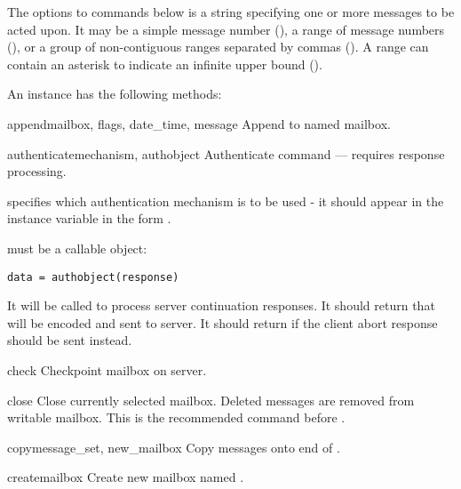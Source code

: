 The  options to commands below is a string specifying one
or more messages to be acted upon.  It may be a simple message number
(), a range of message numbers (), or a group of
non-contiguous ranges separated by commas ().  A range
can contain an asterisk to indicate an infinite upper bound
().

An  instance has the following methods:


\begin{methoddesc}{append}{mailbox, flags, date_time, message}
  Append  to named mailbox. 
\end{methoddesc}

\begin{methoddesc}{authenticate}{mechanism, authobject}
  Authenticate command --- requires response processing.

   specifies which authentication mechanism is to be
  used - it should appear in the instance variable 
  in the form .

   must be a callable object:

\begin{verbatim}
data = authobject(response)
\end{verbatim}

  It will be called to process server continuation responses.
  It should return  that will be encoded and sent to server.
  It should return  if the client abort response \samp{*} should
  be sent instead.
\end{methoddesc}

\begin{methoddesc}{check}{}
  Checkpoint mailbox on server. 
\end{methoddesc}

\begin{methoddesc}{close}{}
  Close currently selected mailbox. Deleted messages are removed from
  writable mailbox. This is the recommended command before
  .
\end{methoddesc}

\begin{methoddesc}{copy}{message_set, new_mailbox}
  Copy  messages onto end of . 
\end{methoddesc}

\begin{methoddesc}{create}{mailbox}
  Create new mailbox named .
\end{methoddesc}

